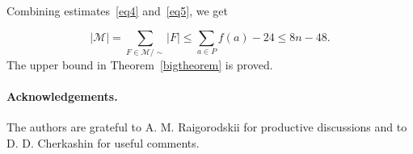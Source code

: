 \documentclass[12pt,a4paper]{article}
\newcommand{\M}{\mathcal{M}}
\begin{document}
Combining estimates~\eqref{eq4} and~\eqref{eq5}, we get

\[
|\M| = \sum_{F \in \M/\sim}|F| \leqslant \sum_{a \in P} f(a) - 24 \leqslant 8n-48.
\]
The upper bound in Theorem~\ref{bigtheorem} is proved.

\paragraph{Acknowledgements.}
The authors are grateful to A. M. Raigorodskii for productive discussions and to D. D. Cherkashin for useful comments.



\end{document}

